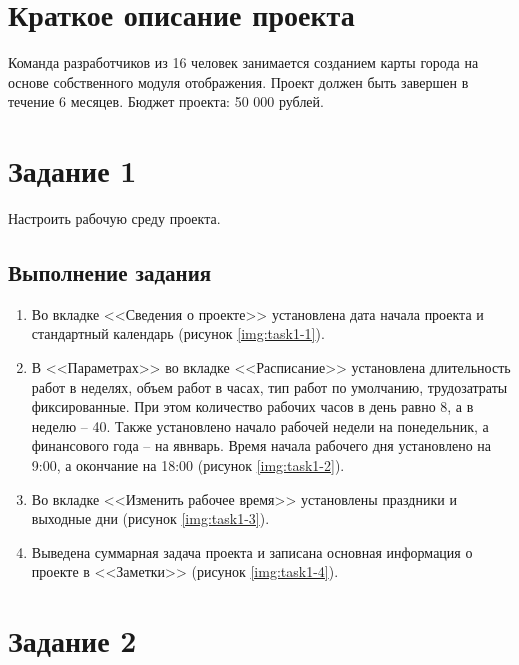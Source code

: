 

\section{Краткое описание проекта}

Команда разработчиков из 16 человек занимается созданием карты города на основе собственного модуля отображения. Проект должен быть завершен в течение 6 месяцев. Бюджет проекта: 50 000 рублей.


\section{Задание 1}

Настроить рабочую среду проекта.

\subsection{Выполнение задания}

\begin{enumerate}
    \item Во вкладке <<Сведения о проекте>> установлена дата начала проекта и стандартный календарь (рисунок \ref{img:task1-1}).

    \item В <<Параметрах>> во вкладке <<Расписание>> установлена длительность работ в неделях, объем работ в часах, тип работ по умолчанию, трудозатраты фиксированные. При этом количество рабочих часов в день равно 8, а в неделю -- 40. Также установлено начало рабочей недели на понедельник, а финансового года -- на явнварь. Время начала рабочего дня установлено на 9:00, а окончание на 18:00 (рисунок \ref{img:task1-2}).

    \item Во вкладке <<Изменить рабочее время>> установлены праздники и выходные дни (рисунок \ref{img:task1-3}).

    \item Выведена суммарная задача проекта и записана основная информация о проекте в <<Заметки>> (рисунок \ref{img:task1-4}).
\end{enumerate}


\section{Задание 2}

